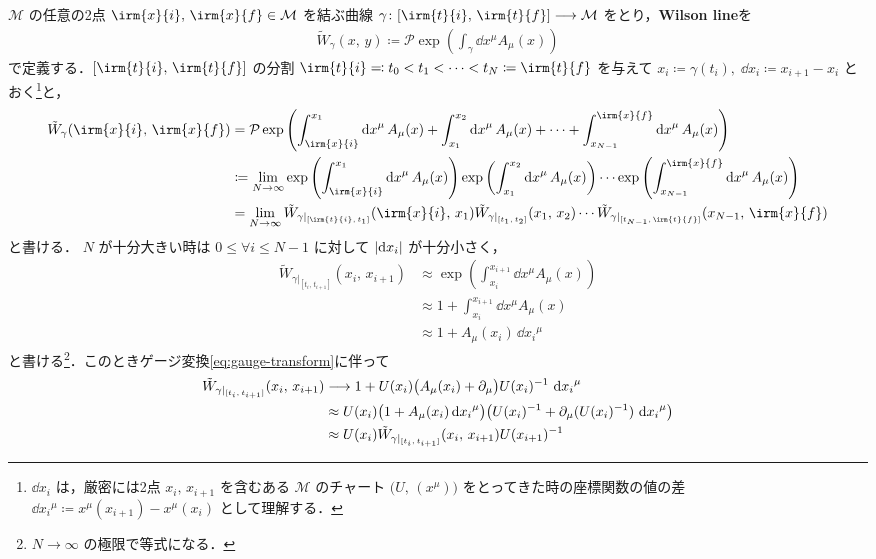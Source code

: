 \documentclass[TQFT_main]{subfiles}
\begin{document}
$\mathcal{M}$ の任意の2点 $\irm{x}{i},\, \irm{x}{f} \in \mathcal{M}$ を結ぶ曲線 $\gamma \colon [\irm{t}{i},\, \irm{t}{f}] \lto \mathcal{M}$ をとり，\textbf{Wilson line}を
\begin{align}
    \tilde{W}_\gamma (x,\, y) \coloneqq \mathcal{P} \exp \left( \int_\gamma \dd{x^\mu} A_\mu (x) \right)
\end{align}
で定義する．$[\irm{t}{i},\, \irm{t}{f}]$ の分割 $\irm{t}{i} \eqqcolon t_0 < t_1 < \dots < t_N \coloneqq \irm{t}{f}$ を与えて $x_i \coloneqq \gamma(t_i),\; \dd{x_i} \coloneqq x_{i+1} - x_{i}$ とおく\footnote{$\dd{x_i}$ は，厳密には2点 $x_i,\, x_{i+1}$ を含むある $\mathcal{M}$ のチャート $\bigl( U,\, (x^\mu) \bigr)$ をとってきた時の座標関数の値の差 $\dd{x_i}^\mu \coloneqq x^\mu(x_{i+1}) - x^\mu(x_{i})$ として理解する．}と，
\begin{align}
    \tilde{W}_\gamma (\irm{x}{i},\, \irm{x}{f}) 
    &= \mathcal{P} \exp \left( \int_{\irm{x}{i}}^{x_1} \dd{x}^\mu A_\mu (x) + \int_{x_1}^{x_2} \dd{x}^\mu A_\mu (x) + \cdots + \int_{x_{N-1}}^{\irm{x}{f}} \dd{x}^\mu A_\mu (x) \right) \\
    &\coloneqq \lim_{N \to \infty} \exp \left(\int_{\irm{x}{i}}^{x_1} \dd{x}^\mu A_\mu (x)\right) \exp \left( \int_{x_1}^{x_2} \dd{x}^\mu A_\mu (x) \right) \cdots \exp \left( \int_{x_{N-1}}^{\irm{x}{f}} \dd{x}^\mu A_\mu (x) \right) \\
    &= \lim_{N \to \infty} \tilde{W}_{\gamma|_{[\irm{t}{i},\, t_1]}} (\irm{x}{i},\, x_1) \tilde{W}_{\gamma|_{[t_1,\, t_2]}} (x_1,\, x_2) \cdots \tilde{W}_{\gamma|_{[t_{N-1},\, \irm{t}{f}]}} (x_{N-1},\, \irm{x}{f}) 
\end{align}
と書ける．
$N$ が十分大きい時は $0 \le \forall i \le N-1$ に対して $\abs{\dd{x_i}}$ が十分小さく，
\begin{align}
    \tilde{W}_{\gamma|_{[t_{i},\, t_{i+1}]}} (x_{i},\, x_{i+1})
    &\approx \exp \left(\int_{x_i}^{x_{i+1}} \dd{x}^\mu A_\mu (x)\right) \\ 
    &\approx 1 + \int_{x_{i}}^{x_{i+1}} \dd{x}^\mu A_\mu (x) \\
    &\approx 1 + A_\mu (x_i)\, \dd{x_i}^\mu
\end{align}
と書ける\footnote{$N \to \infty$ の極限で等式になる．}．このときゲージ変換\eqref{eq:gauge-transform}に伴って
\begin{align}
    \tilde{W}_{\gamma|_{[t_{i},\, t_{i+1}]}} (x_{i},\, x_{i+1})
    &\longrightarrow 1 + U(x_{i}) \bigl(A_\mu (x_{i}) + \partial_\mu\bigr) U(x_{i})^{-1}\, \dd{x_{i}}^\mu \\
    &\approx U(x_i)\bigl( 1 + A_\mu (x_i) \dd{x_i}^\mu \bigr) \bigl(U(x_{i})^{-1} + \partial_\mu (U(x_{i})^{-1})\, \dd{x_i}^\mu \bigr) \\
    &\approx U(x_i) \tilde{W}_{\gamma|_{[t_{i},\, t_{i+1}]}} (x_{i},\, x_{i+1}) U(x_{i+1})^{-1}
\end{align}
\end{document}
